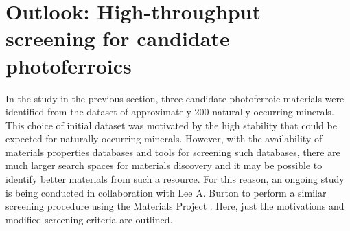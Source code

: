 \documentclass[11pt, twoside]{report}
\begin{document}



\section{Outlook: High-throughput screening for candidate photoferroics}



In the study in the previous section, three candidate photoferroic materials were identified from the dataset of approximately 200 naturally occurring minerals. This choice of initial dataset was motivated by the high stability that could be expected for naturally occurring minerals. However, with the availability of materials properties databases and tools for screening such databases, there are much larger search spaces for materials discovery and it may be possible to identify better materials from such a resource. For this reason, an ongoing study is being conducted in collaboration with Lee A. Burton to perform a similar screening procedure using the Materials Project \cite{materials_project}. Here, just the motivations and modified screening criteria are outlined.
\end{document}
